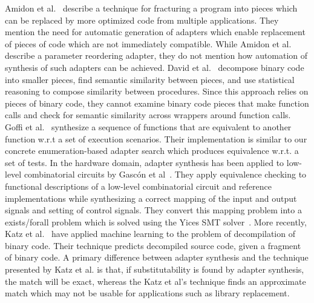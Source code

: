 %
Amidon et al.~\cite{program_fracture} describe a technique for fracturing a program into pieces which can be replaced by more optimized code from multiple applications.
%
They mention the need for automatic generation of adapters which enable replacement of pieces of code which are not immediately compatible.
%
While Amidon et al. describe a parameter reordering adapter, they do not mention how automation of synthesis of such adapters can be achieved.
%
David et al.~\cite{statistical_similarity} decompose binary code into smaller pieces, find semantic similarity between pieces, and use statistical reasoning to compose similarity between procedures.
%
Since this approach relies on pieces of binary code, they cannot examine binary code pieces that make function calls and check for semantic similarity across wrappers around function calls.
%
Goffi et al.~\cite{goffi} synthesize a sequence of functions that are equivalent to another function w.r.t a set of execution scenarios. 
%
Their implementation is similar to our concrete enumeration-based adapter search which produces equivalence w.r.t. a set of tests.
%
In the hardware domain, adapter synthesis has been applied to low-level combinatorial circuits by Gasc\'{o}n et al~\cite{gascon}.
%
They apply equivalence checking to functional descriptions of a low-level combinatorial circuit and reference implementations while synthesizing a correct mapping of the input and output signals and setting of control signals. 
%
They convert this mapping problem into a exists/forall problem which is solved using the Yices SMT solver~\cite{yices}. 
%
More recently, Katz et al.~\cite{katz2018rnn} have applied machine learning to the problem
of decompilation of binary code. 
%
Their technique predicts decompiled source code, given a fragment of
binary code.
%
A primary difference between adapter synthesis and the technique
presented by Katz et al. is that, if substitutability is found by
adapter synthesis, the match will be exact, whereas the Katz et al\rq s
technique finds an approximate match which may not be usable for
applications such as library replacement.
%
%
%
